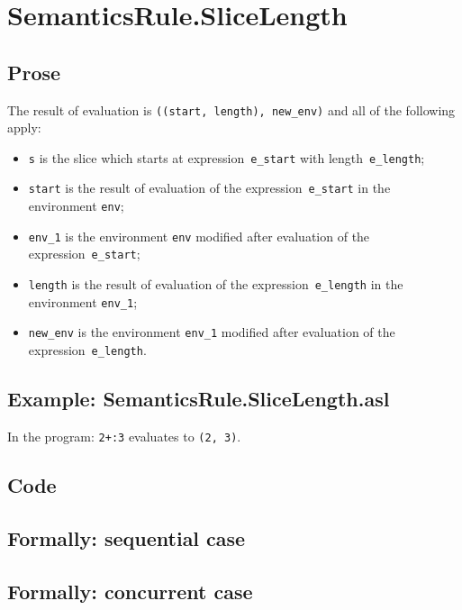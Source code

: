 \documentclass{book}
\begin{document}
\section{SemanticsRule.SliceLength \label{sec:SemanticsRule.SliceLength}}

  \subsection{Prose}
  The result of evaluation is \texttt{((start, length), new\_env)} and all of the following
apply:
  \begin{itemize}
    \item \texttt{s} is the slice which starts at expression~\texttt{e\_start} with length~\texttt{e\_length};
    \item \texttt{start} is the result of evaluation of the
      expression~\texttt{e\_start} in the environment \texttt{env};
    \item \texttt{env\_1} is the environment \texttt{env} modified after
      evaluation of the expression~\texttt{e\_start};
    \item \texttt{length} is the result of evaluation of the
      expression~\texttt{e\_length} in the environment \texttt{env\_1};
    \item \texttt{new\_env} is the environment \texttt{env\_1} modified after
      evaluation of the expression~\texttt{e\_length}.
  \end{itemize}

  \subsection{Example: SemanticsRule.SliceLength.asl}
  In the program:
  \texttt{2+:3} evaluates to \texttt{(2, 3)}.

  \subsection{Code}

\begin{emptyformal}
  \subsection{Formally: sequential case}

  \subsection{Formally: concurrent case}
\end{emptyformal}
\end{document}
